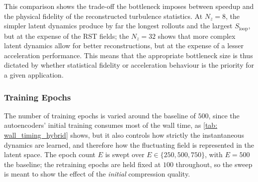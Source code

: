 This comparison shows the trade-off the bottleneck imposes between speedup and the physical fidelity of the reconstructed turbulence statistics. At $N_z = 8$, the simpler latent dynamics produce by far the longest rollouts and the largest $S_\text{loop}$, but at the expense of the RST fields; the $N_z = 32$ shows that more complex latent dynamics allow for better reconstructions, but at the expense of a lesser acceleration performance. This means that the appropriate bottleneck size is thus dictated by whether statistical fidelity or acceleration behaviour is the priority for a given application. 

\subsubsection{Training Epochs}
The number of training epochs is varied around the baseline of $500$, since the autoencoders' initial training consumes most of the wall time, as \autoref{tab: wall_timing_hybrid} shows, but it also controls how strictly the instantaneous dynamics are learned, and therefore how the fluctuating field is represented in the latent space. The epoch count $E$ is swept over $E \in \{250, 500, 750\}$, with $E = 500$ the baseline; the retraining epochs are held fixed at $100$ throughout, so the sweep is meant to show the effect of the \emph{initial} compression quality.

